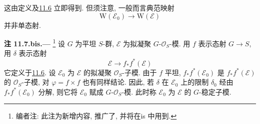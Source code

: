 这由定义及\hyperref[par:sga3-VIB-11.6]{11.6} 立即得到.
但须注意, 一般而言典范映射
\[
  \mathrm W(\mathcal E_0)\longrightarrow\mathrm W(\mathcal E)
\]
并非单态射.

\medskip
{}\label{rem:sga3-VIB-11.7.bis}%
\noindent\textbf{注 11.7.bis.---}%
\footnote{\label{note:sga3-VIB-111}编者注: 此注为新增内容, 推广了,
并将在is 中用到.}
设 \(G\) 为平坦 \(S\)-群, \(\mathcal E\) 为拟凝聚
\(G\)-\(\mathcal O_S\)-模.
用 \(f\) 表示态射 \(G\to S\), 用 \(\delta\) 表示态射
\[
  \mathcal E\longrightarrow f_*f^*(\mathcal E)
\]
它定义于\hyperref[par:sga3-VIB-11.6]{11.6}.
设 \(\mathcal E_0\) 为 \(\mathcal E\) 的拟凝聚 \(\mathcal O_S\)-子模.
由于 \(f\) 平坦, \(f_*f^*(\mathcal E_0)\) 是 \(f_*f^*(\mathcal E)\) 的
\(\mathcal O_S\)-子模, 对 \(\varphi=f\times f\) 也有同样结论.
因此, 若 \(\delta\) 在 \(\mathcal E_0\) 上的限制 \(\delta_0\)
经由 \(f_*f^*(\mathcal E_0)\) 分解,
则它将 \(\mathcal E_0\) 赋成 \(G\)-\(\mathcal O_S\)-模.
此时称 \(\mathcal E_0\) 为 \(\mathcal E\) 的 \(G\)-稳定子模.
